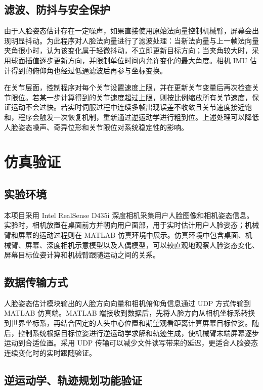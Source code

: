 \documentclass[12pt,a4paper,UTF8]{article}
\begin{document}
\subsection{滤波、防抖与安全保护}

由于人脸姿态估计存在一定噪声，如果直接使用原始法向量控制机械臂，屏幕会出现明显抖动。为此程序对人脸法向量进行了滤波处理：当新法向量与上一帧法向量夹角很小时，认为该变化属于轻微抖动，不立即更新目标方向；当夹角较大时，采用球面插值逐步更新方向，并限制单位时间内允许变化的最大角度。相机 IMU 估计得到的俯仰角也经过低通滤波后再参与坐标变换。

在关节层面，控制程序对每个关节设置速度上限，并在更新关节变量后再次检查关节限位。若某一步计算得到的关节速度超过上限，则按比例缩放所有关节速度，保证运动不会过快。若实时伺服过程中连续多帧出现误差不收敛且关节速度接近饱和，程序会触发一次恢复机制，重新通过逆运动学进行粗到位。上述处理可以降低人脸姿态噪声、奇异位形和关节限位对系统稳定性的影响。

\clearpage
\section{仿真验证}

\subsection{实验环境}

本项目采用 Intel RealSense D435i 深度相机采集用户人脸图像和相机姿态信息。实验时，相机放置在桌面前方并朝向用户面部，用于实时估计用户人脸姿态；机械臂和屏幕的运动过程则在 MATLAB 仿真环境中展示。仿真环境中包含桌面、机械臂、屏幕、深度相机示意模型以及人偶模型，可以较直观地观察人脸姿态变化、屏幕目标位姿计算和机械臂跟随运动之间的关系。

\subsection{数据传输方式}

人脸姿态估计模块输出的人脸方向向量和相机俯仰角信息通过 UDP 方式传输到 MATLAB 仿真端。MATLAB 端接收到数据后，先将人脸方向从相机坐标系转换到世界坐标系，再结合固定的人头中心位置和期望观看距离计算屏幕目标位姿。随后，控制系统根据目标位姿进行逆运动学求解和轨迹生成，使机械臂末端屏幕逐步运动到合适位置。采用 UDP 传输可以减少文件读写带来的延迟，更适合人脸姿态连续变化时的实时跟随验证。

\subsection{逆运动学、轨迹规划功能验证}
\end{document}

